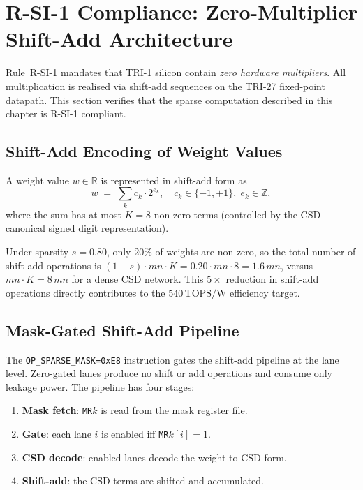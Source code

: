 \section{R-SI-1 Compliance: Zero-Multiplier Shift-Add Architecture}
\label{sec:r-si-1}

Rule~R-SI-1 mandates that TRI-1 silicon contain \emph{zero hardware multipliers}.
All multiplication is realised via shift-add sequences on the TRI-27 fixed-point
datapath.  This section verifies that the sparse computation described in this
chapter is R-SI-1 compliant.

\subsection{Shift-Add Encoding of Weight Values}
\label{subsec:shift-add}

\begin{definition}
\label{def:shift-add}
A weight value $w \in \mathbb{R}$ is represented in shift-add form as
\[
  w \;=\; \sum_{k} c_k \cdot 2^{e_k},
  \quad c_k \in \{-1, +1\},\; e_k \in \mathbb{Z},
\]
where the sum has at most $K = 8$ non-zero terms (controlled by the CSD
canonical signed digit representation).
\end{definition}

Under sparsity $s=0.80$, only $20\%$ of weights are non-zero, so the total
number of shift-add operations is $(1-s) \cdot mn \cdot K = 0.20 \cdot mn \cdot 8
= 1.6\,mn$, versus $mn \cdot K = 8\,mn$ for a dense CSD network.  This
$5\times$ reduction in shift-add operations directly contributes to the
$540\,\mathrm{TOPS/W}$ efficiency target.

\subsection{Mask-Gated Shift-Add Pipeline}
\label{subsec:pipeline}

The \texttt{OP\_SPARSE\_MASK=0xE8} instruction gates the shift-add pipeline
at the lane level.  Zero-gated lanes produce no shift or add operations and
consume only leakage power.  The pipeline has four stages:

\begin{enumerate}
  \item \textbf{Mask fetch}: \texttt{MR$k$} is read from the mask register file.
  \item \textbf{Gate}: each lane $i$ is enabled iff \texttt{MR$k$}$[i] = 1$.
  \item \textbf{CSD decode}: enabled lanes decode the weight to CSD form.
  \item \textbf{Shift-add}: the CSD terms are shifted and accumulated.
\end{enumerate}

